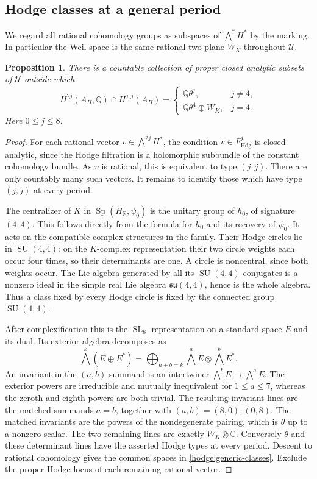 \documentclass[11pt]{article}
\newtheorem{proposition}[theorem]{Proposition}
\theoremstyle{definition}
\theoremstyle{remark}
\newcommand{\Q}{\mathbb Q}
\newcommand{\R}{\mathbb R}
\newcommand{\C}{\mathbb C}
\DeclareMathOperator{\SL}{SL}
\DeclareMathOperator{\SU}{SU}
\DeclareMathOperator{\Sp}{Sp}
\numberwithin{equation}{section}
\begin{document}
\subsection{Hodge classes at a general period}

We regard all rational cohomology groups as subspaces of
$\bigwedge^*H^*$ by the marking.  In particular the Weil space is the
same rational two-plane $W_K$ throughout $\mathcal U$.

\begin{proposition}
\label{hodge:generic-hodge}
There is a countable collection of proper closed analytic subsets of
$\mathcal U$ outside which
\begin{equation}
 H^{2j}(A_\Pi,\Q)\cap H^{j,j}(A_\Pi)=
 \begin{cases}
  \Q\theta^j,&j\ne4,\\
  \Q\theta^4\oplus W_K,&j=4.
 \end{cases}
 \label{hodge:generic-classes}
\end{equation}
Here $0\le j\le8$.
\end{proposition}

\begin{proof}
For each rational vector $v\in\bigwedge^{2j}H^*$, the condition
$v\in F^j_{\mathrm{Hdg}}$ is closed analytic, since the Hodge filtration
is a holomorphic subbundle of the constant cohomology bundle.
As $v$ is rational, this is equivalent to type $(j,j)$.
There are only countably many such vectors.  It remains to identify those
which have type $(j,j)$ at every period.

The centralizer of $K$ in $\Sp(H_\R,\psi_0)$ is the unitary group of
$h_0$, of signature $(4,4)$.  This follows directly from the formula for
$h_0$ and its recovery of $\psi_0$.  It acts on the compatible complex
structures in the family.  Their Hodge circles lie in $\SU(4,4)$:
on the $K$-complex representation their two circle weights each occur
four times, so their determinants are one.  A circle is noncentral,
since both weights occur.  The Lie algebra generated by all its
$\SU(4,4)$-conjugates is a nonzero ideal in the simple real Lie algebra
$\mathfrak{su}(4,4)$, hence is the whole algebra.  Thus a class fixed
by every Hodge circle is fixed by the connected group $\SU(4,4)$.

After complexification this is the $\SL_8$-representation on a standard
space $E$ and its dual.  Its exterior algebra decomposes as
\[
 \bigwedge^k(E\oplus E^*)=
 \bigoplus_{a+b=k}\bigwedge^aE\otimes\bigwedge^bE^*.
\]
An invariant in the $(a,b)$ summand is an intertwiner
$\bigwedge^bE\to\bigwedge^aE$.  The exterior powers are irreducible
and mutually inequivalent for $1\le a\le7$, whereas the zeroth and
eighth powers are both trivial.  The resulting invariant lines are the
matched summands $a=b$, together with $(a,b)=(8,0),(0,8)$.
The matched invariants are the powers of the nondegenerate pairing,
which is $\theta$ up to a nonzero scalar.  The two remaining lines are
exactly $W_K\otimes\C$.  Conversely $\theta$ and these determinant
lines have the asserted Hodge types at every period.  Descent to rational
cohomology gives the common spaces in \eqref{hodge:generic-classes}.
Exclude the proper Hodge locus of each remaining rational vector.
\end{proof}
\end{document}
